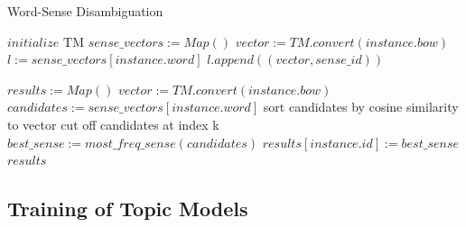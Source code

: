 %
%
\begin{algorithm}[!t]
\caption{Word-Sense Disambiguation}\label{wsdalgorithm}
\begin{algorithmic}[1]
\State $\textit{initialize} \text{ TM} $
\State $\textit{sense\_vectors} := \textit{Map} {()}$
 \State$	vector := TM.convert(instance.bow)$
 \State$	l := sense\_vectors[instance.word]$
 \State$	l.append((vector, sense\_id))$
 
\EndFor
\EndProcedure
{}
\State $\textit{results} := \textit{Map} {()}$
 \State$	vector := TM.convert(instance.bow)$
 \State$	candidates := sense\_vectors[instance.word]$
 \State	sort candidates by cosine similarity to vector
 \State	cut off candidates at index k
 \State$	best\_sense := most\_freq\_sense(candidates)$
 \State$	results[instance.id] := best\_sense$
 \State \Return $results$
\EndFor
\EndProcedure
\end{algorithmic}
\end{algorithm}

\subsection{Training of Topic Models}
\label{creation}

